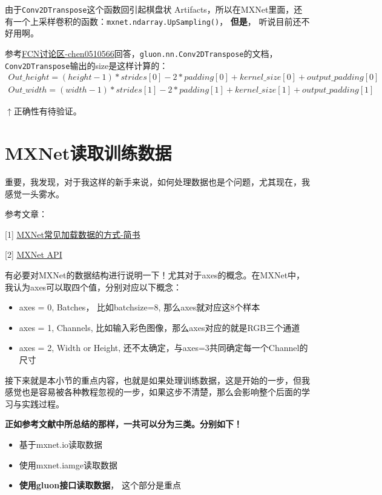 由于\verb|Conv2DTranspose|这个函数回引起棋盘状 Artifacts，所以在MXNet里面，还有一个上采样卷积的函数：\verb|mxnet.ndarray.UpSampling()|， \textbf{但是}， 听说目前还不好用啊。

参考\href{https://discuss.gluon.ai/t/topic/3041/14}{FCN讨论区-chen0510566}回答，\verb|gluon.nn.Conv2DTranspose|的文档，\verb|Conv2DTranspose|输出的size是这样计算的：
\begin{displaymath}
\begin{gathered}
Out\_height = (height - 1) * strides[0] - 2 * padding[0] + kernel\_size[0] + output\_padding[0] \\
Out\_width = (width - 1) * strides[1] - 2 * padding[1] + kernel\_size[1] + output\_padding[1]
\end{gathered}
\end{displaymath}

$\uparrow$正确性有待验证。

\section{MXNet读取训练数据}

重要，我发现，对于我这样的新手来说，如何处理数据也是个问题，尤其现在，我感觉一头雾水。

参考文章：

[1] \href{https://www.jianshu.com/p/38d55c9dbdb8}{MXNet常见加载数据的方式-简书}

[2] \href{https://mxnet.incubator.apache.org/api/python/io/io.html}{MXNet API}


有必要对MXNet的数据结构进行说明一下！尤其对于axes的概念。在MXNet中，我认为axes可以取四个值，分别对应以下概念：
\begin{itemize}
\item axes = 0, Batches， 比如batchsize=8, 那么axes就对应这8个样本
\item axes = 1, Channels, 比如输入彩色图像，那么axes对应的就是RGB三个通道
\item axes = 2, Width or Height, 还不太确定，与axes=3共同确定每一个Channel的尺寸
\end{itemize}

接下来就是本小节的重点内容，也就是如果处理训练数据，这是开始的一步，但我感觉也是容易被各种教程忽视的一步，如果这步不清楚，那么会影响整个后面的学习与实践过程。

{\bfseries 正如参考文献中所总结的那样，一共可以分为三类。分别如下！}

\begin{itemize}
\item 基于mxnet.io读取数据
\item 使用mxnet.iamge读取数据
\item \textbf{使用gluon接口读取数据}， 这个部分是重点
\end{itemize}

